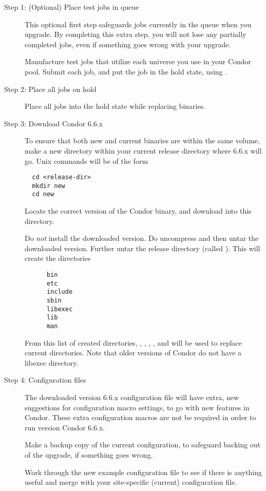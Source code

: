 \begin{description}
\item[Step 1:  (Optional) Place test jobs in queue]
This optional first step safeguards jobs currently in the
queue when you upgrade.
By completing this extra step, you will not lose any
partially completed jobs, even if something goes wrong with
your upgrade.

Manufacture test jobs that utilize each universe you use in
your Condor pool.
Submit each job, and put the job in the hold state, 
using .

\item[Step 2:  Place all jobs on hold]
Place all jobs into the hold state while replacing binaries.


\item[Step 3:  Download Condor 6.6.x]
To ensure that both new and current binaries are within
the same volume,
make a new directory within your current release
directory where 6.6.x 
will go. 
Unix commands will be of the form
\begin{verbatim}
  cd <release-dir>
  mkdir new
  cd new
\end{verbatim}

Locate the correct version of the Condor
binary, and download into this  directory.

Do \emph{not} install the downloaded version.
Do uncompress and then untar the downloaded version.
Further untar the release directory (called ).
This will create the directories
\begin{verbatim}
      bin
      etc
      include
      sbin
      libexec
      lib
      man
\end{verbatim}
From this list of created directories, 
,
,
, 
, and
 will be used to replace current directories. Note that
older versions of Condor do not have a libexec directory.

\item[Step 4:  Configuration files]
The downloaded version 6.6.x
configuration file will have extra, new suggestions
for configuration macro settings,
to go with new features in Condor.
These extra configuration macros
are not be required in order to run version Condor 6.6.x.

Make a backup copy of the current configuration, to
safeguard backing out of the upgrade, if something goes wrong.

Work through the new
example configuration file to see if there
is anything useful and merge with your site-specific (current)
configuration file.


\end{description}
